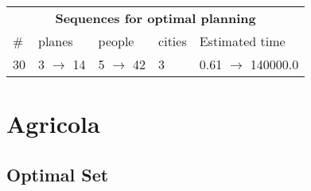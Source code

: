 \documentclass{article}
\begin{document}
                            \begin{center}
                            \begin{tabular}{l|l|l|l|l}
                            \multicolumn{5}{c}{\bf \large Sequences for optimal planning}\\
                            \# & planes & people & cities & Estimated time\\\midrule
                            30&3 $\rightarrow$ 14&5 $\rightarrow$ 42&3&0.61 $\rightarrow$ 140000.0
                            \end{tabular}
                            \end{center}
                    \newpage \section{Agricola}
                    \subsection*{Optimal Set}
                    
\end{document}
